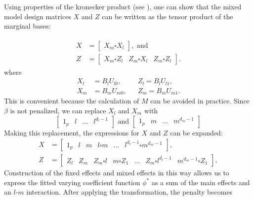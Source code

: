 \documentclass[12pt]{article}
\newcommand{\ms}{\scriptscriptstyle}
\theoremstyle{definition}
\begin{document}
Using properties of the kronecker product (see \citet{liu1999matrix}), one can show that the mixed model design matrices $X$ and $Z$ can be written as the tensor product of the marginal bases:

\begin{align}
\begin{split} \label{eq:mixed-model-tensor-matrices}
X &= \left[ \begin{array}{c} X_m \square X_l \end{array} \right], \mbox{ and} \\
Z &= \left[ \begin{array}{c|c|c} X_m \square Z_l & Z_m \square X_l & Z_m \square Z_l \end{array} \right].
\end{split}
\end{align}
\noindent
where 
\begin{align*}
X_l &= B_l U_{l0}, & &Z_l = B_l U_{l1}, \\ 
X_m &= B_m U_{m0}, & &Z_m = B_m U_{m1}.
\end{align*}
\noindent
This is convenient because the calculation of $M$ can be avoided in practice. Since $\beta$ is not penalized, we can replace $X_l$ and $X_m$ with 
\begin{equation*}
\left[\begin{array}{c|c|c|c} 1_p & l & \dots & l^{d_{\ms l} -1}  \end{array} \right] \mbox{ and } \left[\begin{array}{c|c|c|c} 1_p & m & \dots & m^{d_{\ms m} -1}  \end{array} \right]
\end{equation*}
Making this replacement, the expressions for $X$ and $Z$ can be expanded:
\begin{align}
X &= \left[ \begin{array}{c|c|c|c|c|c} 1_p & l & m & l \square m & \dots  & l^{\ms d_{\ms l} -1 } \square  m^{\ms d_{\ms m} -1 } \end{array} \right], \\
Z &= \left[ \begin{array}{c|c|c|c|c|c|c}  Z_l & Z_m & Z_m \square l & m \square Z_1 & \dots & Z_m \square l^{\ms d_{\ms l} \ms -1} & m^{d_{\ms m} -1} \square Z_1   \end{array} \right],
\end{align}
Construction of the fixed effects and mixed effects in this way allows us to express the fitted varying coefficient function $\phi^*$ as a sum of the main effects and an $l$-$m$ interaction. After applying the transformation, the penalty becomes
\end{document}
